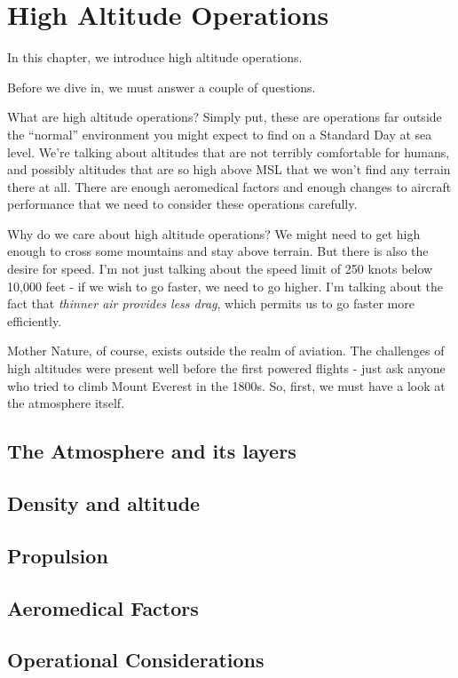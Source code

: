 \chapter{High Altitude Operations}

In this chapter, we introduce high altitude operations.

Before we dive in, we must answer a couple of questions.

What are high altitude operations? Simply put, these are operations far outside the ``normal'' environment you might expect to find on a Standard Day at sea level. We're talking about altitudes that are not terribly comfortable for humans, and possibly altitudes that are so high above MSL that we won't find any terrain there at all. There are enough aeromedical factors and enough changes to aircraft performance that we need to consider these operations carefully.

Why do we care about high altitude operations? We might need to get high enough to cross some mountains and stay above terrain. But there is also the desire for speed. I'm not just talking about the speed limit of 250 knots below 10,000 feet - if we wish to go faster, we need to go higher. I'm talking about the fact that \emph{thinner air provides less drag}, which permits us to go faster more efficiently.

Mother Nature, of course, exists outside the realm of aviation. The challenges of high altitudes were present well before the first powered flights - just ask anyone who tried to climb Mount Everest in the 1800s. So, first, we must have a look at the atmosphere itself.

\section{The Atmosphere and its layers}

\section{Density and altitude}

\section{Propulsion}

\section{Aeromedical Factors}

\section{Operational Considerations}

